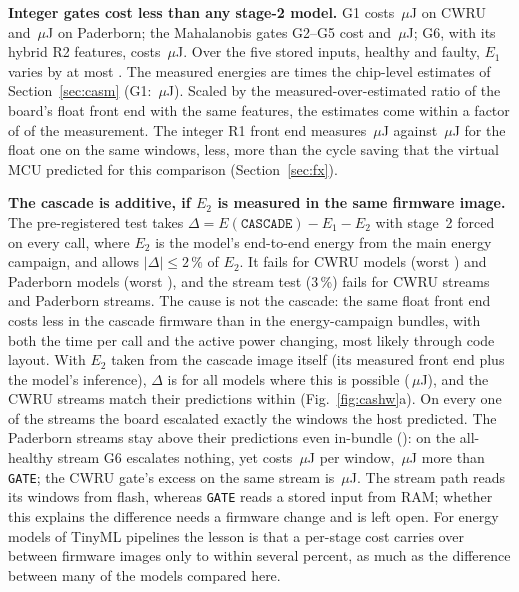 \textbf{Integer gates cost less than any stage-2 model.} G1 costs
\NumChCwEOneSup{}\,$\mu$J on CWRU and \NumChPuEOneSup{}\,$\mu$J on Paderborn; the Mahalanobis gates G2--G5 cost
\NumChCwEOneMah{} and \NumChPuEOneMah{}\,$\mu$J; G6, with its hybrid R2 features, costs \NumChPuEOneSix{}\,$\mu$J.
Over the five stored inputs, healthy and faulty, $E_1$ varies by at most \NumChInputSpread{}. The measured energies
are \NumChRatioEst{} times the chip-level estimates of Section~\ref{sec:casm} (G1: \NumChCwEOneSupEst{}\,$\mu$J).
Scaled by the measured-over-estimated ratio of the board's float front end with the same features, the estimates come
within a factor of \NumChRatioCal{} of the measurement. The integer R1 front end measures \NumChCwFxROne{}\,$\mu$J against
\NumChCwFloatROne{}\,$\mu$J for the float one on the same windows, \NumChCwFxROneSave{} less, more than the
\NumFxMfROneSave{} cycle saving that the virtual MCU predicted for this comparison (Section~\ref{sec:fx}).

\textbf{The cascade is additive, if $E_2$ is measured in the same firmware image.} The pre-registered test takes
$\Delta = E(\texttt{CASCADE}) - E_1 - E_2$ with stage~2 forced on every call, where $E_2$ is the model's end-to-end energy from
the main energy campaign, and allows $|\Delta| \leq 2\,\%$ of $E_2$.
It fails for \NumChCwRqThreeFail{} CWRU models (worst \NumChCwRqThreeWorst{}) and \NumChPuRqThreeFail{} Paderborn
models (worst \NumChPuRqThreeWorst{}), and the stream test (3\,\%) fails for \NumChCwRqFourFail{} CWRU streams and
\NumChPuRqFourFail{} Paderborn streams. The cause is not the cascade: the same float front end costs \NumChImage{}
less in the cascade firmware than in the energy-campaign bundles, with both the
time per call and the active power changing, most likely through code layout. With $E_2$ taken from the cascade
image itself (its measured front end plus the model's inference), $\Delta$ is \NumChRqThreeInb{} for all
\NumChRqThreeInbN{} models where this is possible (\NumChRqThreeInbUj{}\,$\mu$J), and the CWRU streams match
their predictions within \NumChCwRqFourInb{} (Fig.~\ref{fig:cashw}a). On every one of the \NumChStreams{} streams the board
escalated exactly the windows the host predicted. The Paderborn streams stay above their
predictions even in-bundle (\NumChPuRqFourInb{}): on the all-healthy stream G6 escalates nothing, yet costs \NumChPuSZeroMeas{}\,$\mu$J per
window, \NumChPuSZeroOver{}\,$\mu$J more than \texttt{GATE}; the CWRU gate's excess on the same stream is
\NumChCwSZeroOver{}\,$\mu$J. The
stream path reads its windows from flash, whereas \texttt{GATE} reads a stored input from RAM; whether this explains
the difference needs a firmware change and is left open. For energy models of TinyML pipelines the lesson is that a
per-stage cost carries over between firmware images only to within several percent, as much as the difference
between many of the models compared here.

